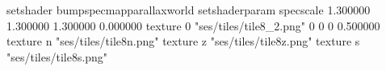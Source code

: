 setshader bumpspecmapparallaxworld
setshaderparam specscale 1.300000 1.300000 1.300000 0.000000
texture 0 "ses/tiles/tile8_2.png" 0 0 0 0.500000
texture n "ses/tiles/tile8n.png"
texture z "ses/tiles/tile8z.png"
texture s "ses/tiles/tile8s.png"

